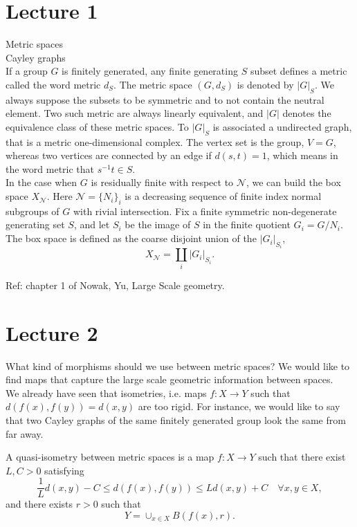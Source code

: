 \section{Lecture 1}

Metric spaces\\
Cayley graphs\\

If a group $G$ is finitely generated, any finite generating $S$ subset defines a metric called the word metric $d_S$. The metric space $(G,d_S)$ is denoted by $|G|_S$. We always suppose the subsets to be symmetric and to not contain the neutral element. Two such metric are always linearly equivalent, and $|G|$ denotes the equivalence class of these metric spaces. To $|G|_S$ is associated a undirected graph, that is a metric one-dimensional complex. The vertex set is the group, $V= G$, whereas two vertices are connected by an edge if $d(s,t)=1$, which means in the word metric that $s^{-1}t\in S$.\\

In the case when $G$ is residually finite with respect to $\mathcal N$, we can build the box space $X_{\mathcal N}$. Here $\mathcal N=\{N_i\}_i$ is a decreasing sequence of finite index normal subgroups of $G$ with rivial intersection. Fix a finite symmetric non-degenerate generating set $S$, and let $S_i$ be the image of $S$ in the finite quotient $G_i= G/N_i$. The box space is defined as the coarse disjoint union of the $|G_i|_{S_i}$,
\[X_{\mathcal N} = \coprod_i |G_i|_{S_i}. \] 

Ref: chapter 1 of Nowak, Yu, Large Scale geometry.
\section{Lecture 2}

What kind of morphisms should we use between metric spaces? We would like to find maps that capture the large scale geometric information between spaces.\\

We already have seen that isometries, i.e. maps $f : X\rightarrow Y$ such that $d(f(x),f(y)) = d(x,y)$ are too rigid. For instance, we would like to say that two Cayley graphs of the same finitely generated group look the same from far away. 

\begin{definition}
A quasi-isometry between metric spaces is a map $f : X\rightarrow Y$ such that there exist $L,C>0$ satisfying
\[\frac{1}{L} d(x,y) - C \leq d(f(x),f(y)) \leq L d(x,y) + C \quad \forall x,y \in X,\]
and there exists $r>0$ such that 
\[Y = \cup_{x\in X} B(f(x), r).\]
\end{definition}

